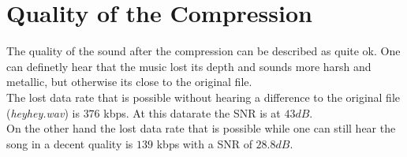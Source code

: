\documentclass[10pt]{article}
\begin{document}
\section{Quality of the Compression}
The quality of the sound after the compression can be described as quite ok.
One can definetly hear that the music lost its depth and sounds more harsh and metallic, but otherwise its close to the original file. \\
The lost data rate that is possible without hearing a difference to the original file (\textit{heyhey.wav}) is $376$ kbps.
At this datarate the SNR is at $43 dB$.\\
On the other hand the lost data rate that is possible while one can still hear the song in a decent quality is $139$ kbps with a SNR of $28.8 dB$.
\end{document}
